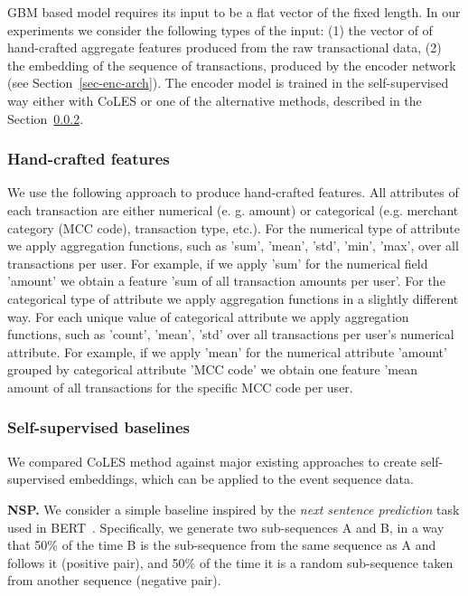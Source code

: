 \documentclass[sigconf, anonymous]{acmart}
\begin{document}
GBM based model requires its input to be a flat vector of the fixed length. In our experiments we consider the following types of the input: (1) the vector of of hand-crafted aggregate features produced from the raw transactional data, (2) the embedding of the sequence of transactions, produced by the encoder network (see Section~\ref{sec-enc-arch}). The encoder model is trained in the self-supervised way either with CoLES or one of the alternative methods, described in the Section~\ref{sec-ss-base}.

\subsubsection{Hand-crafted features} \label{sec-hand-features}

We use the following approach to produce hand-crafted features. All attributes of each transaction are either numerical (e. g. amount) or categorical (e.g. merchant category (MCC code), transaction type, etc.).
For the numerical type of attribute we apply aggregation functions, such as 'sum', 'mean', 'std', 'min', 'max', over all transactions per user. For example, if we apply 'sum' for the numerical field 'amount' we obtain a feature 'sum of all transaction amounts per user'.
For the categorical type of attribute we apply aggregation functions in a slightly different way. For each unique value of categorical attribute we apply aggregation functions, such as 'count', 'mean', 'std' over all transactions per user's numerical attribute. For example, if we apply 'mean' for the numerical attribute 'amount' grouped by categorical attribute 'MCC code' we obtain one feature 'mean amount of all transactions for the specific MCC code per user.

\subsubsection{Self-supervised baselines} \label{sec-ss-base}

We compared CoLES method against major existing approaches to create self-supervised embeddings, which can be applied to the event sequence data.

\textbf{NSP.} We consider a simple baseline inspired by the \textit{next sentence prediction} task used in BERT~\citep{Devlin2019BERTPO}. Specifically, we generate two sub-sequences A and B, in a way that 50\% of the time B is the sub-sequence from the same sequence as A and follows it (positive pair), and 50\% of the time it is a random sub-sequence taken from another sequence (negative pair).
\end{document}
